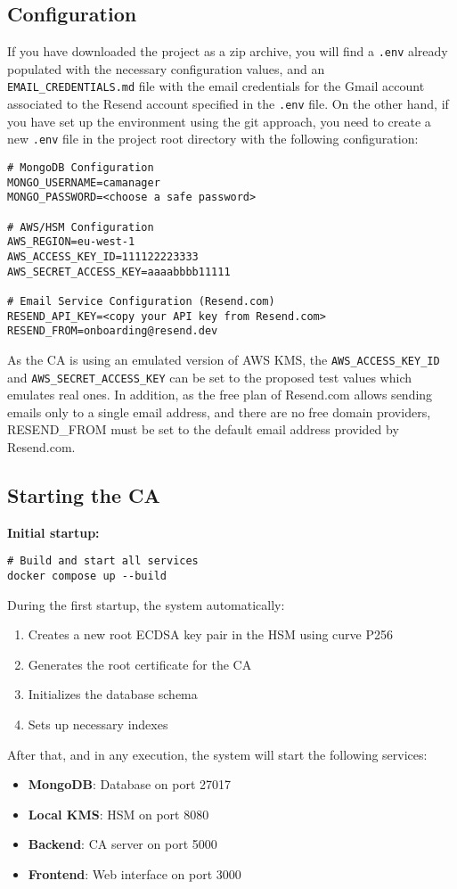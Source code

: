 \subsection{Configuration}
If you have downloaded the project as a zip archive, you will find a \texttt{.env} already populated
with the necessary configuration values, and an \texttt{EMAIL\_CREDENTIALS.md} file with the email credentials for 
the Gmail account associated to the Resend account specified in the \texttt{.env} file.
On the other hand, if you have set up the environment using the git approach, you need to create a new
\texttt{.env} file in the project root directory with the following configuration:
\begin{verbatim}
# MongoDB Configuration
MONGO_USERNAME=camanager
MONGO_PASSWORD=<choose a safe password>

# AWS/HSM Configuration
AWS_REGION=eu-west-1
AWS_ACCESS_KEY_ID=111122223333
AWS_SECRET_ACCESS_KEY=aaaabbbb11111

# Email Service Configuration (Resend.com)
RESEND_API_KEY=<copy your API key from Resend.com>
RESEND_FROM=onboarding@resend.dev
\end{verbatim}
As the CA is using an emulated version of AWS KMS, the 
\texttt{AWS\_ACCESS\_KEY\_ID} and \texttt{AWS\_SECRET\_ACCESS\_KEY} can be set to the proposed 
test values which emulates real ones. In addition, as the free plan of Resend.com allows sending 
emails only to a single email address, and there are no free domain providers, RESEND\_FROM must be 
set to the default email address provided by Resend.com.

\subsection{Starting the CA}

\textbf{Initial startup:}
\begin{verbatim}
# Build and start all services
docker compose up --build
\end{verbatim}
During the first startup, the system automatically:
\begin{enumerate}
    \item Creates a new root ECDSA key pair in the HSM using curve P256
    \item Generates the root certificate for the CA
    \item Initializes the database schema
    \item Sets up necessary indexes
\end{enumerate}
After that, and in any execution, the system will start the following services:
\begin{itemize}
    \item \textbf{MongoDB}: Database on port 27017
    \item \textbf{Local KMS}: HSM on port 8080
    \item \textbf{Backend}: CA server on port 5000
    \item \textbf{Frontend}: Web interface on port 3000
\end{itemize}

